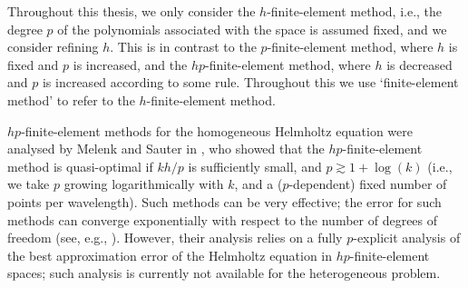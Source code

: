 


Throughout this thesis, we only consider the $h$-finite-element method, i.e., the degree $p$ of the polynomials associated with the space is assumed fixed, and we consider refining $h.$ This is in contrast to the $p$-finite-element method, where $h$ is fixed and $p$ is increased, and the $hp$-finite-element method, where $h$ is decreased and $p$ is increased according to some rule. Throughout this  we use `finite-element method' to refer to the $h$-finite-element method.

$hp$-finite-element methods for the homogeneous Helmholtz equation were analysed by Melenk and Sauter in \cite{MeSa:10,MeSa:11}, who showed that the $hp$-finite-element method is quasi-optimal if $kh/p$ is sufficiently small, and $p \gtrsim 1 + \log(k)$ (i.e., we take $p$ growing logarithmically with $k$, and a ($p$-dependent) fixed number of points per wavelength). Such methods can be very effective; the error for such methods can converge exponentially with respect to the number of degrees of freedom (see, e.g., \cite[Theorem 4.51]{Sc:98}). However, their analysis relies on a fully $p$-explicit analysis of the best approximation error of the Helmholtz equation in $hp$-finite-element spaces; such analysis is currently not available for the heterogeneous problem.
\ere


